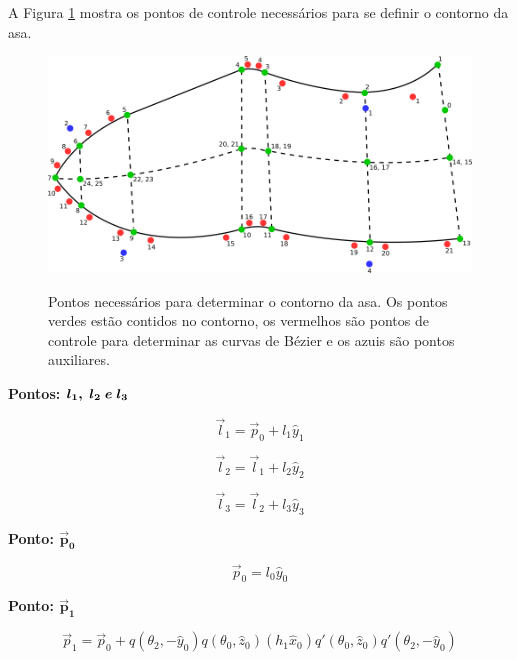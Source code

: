 \documentclass[10pt,a4paper]{report}
\begin{document}
A Figura \ref{fig:geo_wing_points} mostra os pontos de controle necessários para se definir o contorno da asa.

\begin{figure}[h!]
	\centering
	\caption{Pontos necessários para determinar o contorno da asa. Os pontos verdes estão contidos no contorno, os vermelhos são pontos de controle para determinar as curvas de Bézier e os azuis são pontos auxiliares.}
	\includegraphics[width=1.0\textwidth]{figures/geo_wing_points.png}
	\label{fig:geo_wing_points}
\end{figure}

\textbf{Pontos: {$\boldsymbol{l_{1}, \hspace{0.1cm} l_{2} \hspace{0.1cm} e \hspace{0.1cm} l_{3}}$}}

\begin{equation}
\vec{l}_{1} = \vec{p}_{0} + l_{1} \hat{y}_{1}
\label{eq:l1}
\end{equation}

\begin{equation}
\vec{l}_{2} = \vec{l}_{1} + l_{2} \hat{y}_{2}
\label{eq:l2}
\end{equation}

\begin{equation}
\vec{l}_{3} = \vec{l}_{2} + l_{3} \hat{y}_{3}
\label{eq:l3}
\end{equation}

\textbf{Ponto: {$\boldsymbol{\vec{p}_{0}}$}}

\begin{equation}
\vec{p}_{0} = l_{0} \hat{y}_{0}
\label{eq:p0}
\end{equation}

\textbf{Ponto: {$\boldsymbol{\vec{p}_{1}}$}}

\begin{equation}
\vec{p}_{1} = \vec{p}_{0} + q(\theta_{2}, -\hat{y}_{0}) q(\theta_{0}, \hat{z}_{0}) (h_{1} \hat{x}_{0}) q'(\theta_{0}, \hat{z}_{0}) q'(\theta_{2}, -\hat{y}_{0})
\label{eq:p1}
\end{equation}
\end{document}
